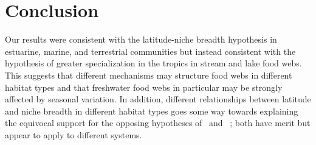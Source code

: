 \documentclass[12pt]{article}
\begin{document}
\section*{Conclusion}

  Our results were consistent with the latitude-niche breadth hypothesis in estuarine, marine,
  and terrestrial communities but instead consistent with the hypothesis of greater specialization
  in the tropics in stream and lake food webs. This suggests that different mechanisms may structure
  food webs in different habitat types and that freshwater food webs in particular may be strongly
  affected by seasonal variation. In addition, different relationships between latitude and niche
  breadth in different habitat types goes some way towards explaining the equivocal support for
  the opposing hypotheses of~\citet{Brown2004} and ~\citet{Davies2007}; both have merit but appear
  to apply to different systems.



\newpage

\newpage



\end{document}
